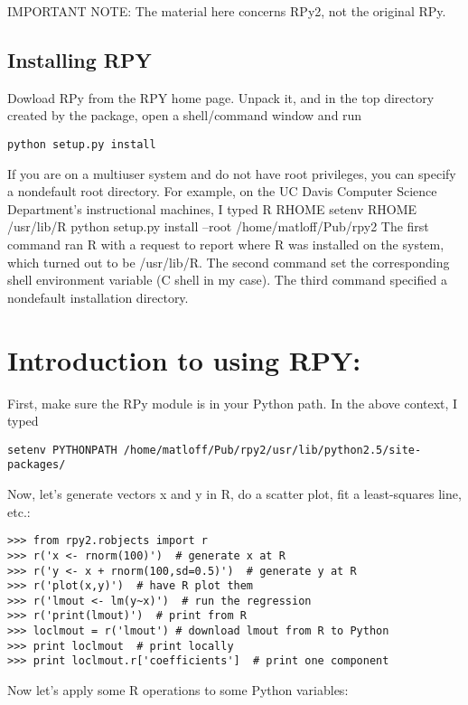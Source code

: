 \documentclass[a4paper,12pt]{article}
\begin{document}
IMPORTANT NOTE: The material here concerns RPy2, not the original RPy.

\subsection{Installing RPY}


Dowload RPy from the RPY home page. Unpack it, and in the top directory created by the package, open a shell/command window and run
\begin{verbatim}
python setup.py install
\end{verbatim}

If you are on a multiuser system and do not have root privileges, you can specify a nondefault root directory. For example, on the UC Davis Computer Science Department's instructional machines, I typed
R RHOME
setenv RHOME /usr/lib/R
python setup.py install --root /home/matloff/Pub/rpy2
The first command ran R with a request to report where R was installed on the system, which turned out to be /usr/lib/R. The second command set the corresponding shell environment variable (C shell in my case). The third command specified a nondefault installation directory.

\section{Introduction to using RPY:}

First, make sure the RPy module is in your Python path. In the above context, I typed
\begin{verbatim}
setenv PYTHONPATH /home/matloff/Pub/rpy2/usr/lib/python2.5/site-packages/
\end{verbatim}
Now, let's generate vectors x and y in R, do a scatter plot, fit a least-squares line, etc.:

\begin{verbatim}
>>> from rpy2.robjects import r
>>> r('x <- rnorm(100)')  # generate x at R
>>> r('y <- x + rnorm(100,sd=0.5)')  # generate y at R
>>> r('plot(x,y)')  # have R plot them
>>> r('lmout <- lm(y~x)')  # run the regression
>>> r('print(lmout)')  # print from R
>>> loclmout = r('lmout') # download lmout from R to Python
>>> print loclmout  # print locally
>>> print loclmout.r['coefficients']  # print one component
\end{verbatim}
Now let's apply some R operations to some Python variables:
\end{document}
